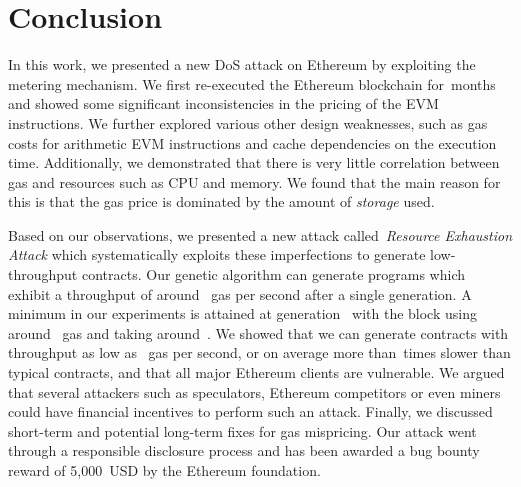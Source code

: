 \section{Conclusion}
\label{sec:conclusion}

In this work, we presented a new DoS attack on Ethereum by exploiting the metering mechanism. We first re-executed the Ethereum blockchain for~\Months months and showed some significant inconsistencies in the pricing of the EVM instructions. We further explored various other design weaknesses, such as gas costs for arithmetic EVM instructions and cache dependencies on the execution time. Additionally, we demonstrated that there is very little correlation between gas and resources such as CPU and memory. We found that the main reason for this is that the gas price is dominated by the amount of \emph{storage} used.

Based on our observations, we presented a new attack called~\emph{Resource Exhaustion Attack} which systematically exploits these imperfections to generate low-throughput contracts. Our genetic algorithm can generate programs which exhibit a throughput of around~ gas per second after a single generation. A minimum in our experiments is attained at generation~ with the block using around~ gas and taking around~.
We showed that we can generate contracts with throughput as low as~ gas per second, or on average more than~\Slowdown times slower than typical contracts, and that all major Ethereum clients are vulnerable. We argued that several attackers such as speculators, Ethereum competitors or even miners could have financial incentives to perform such an attack. Finally, we discussed short-term and potential long-term fixes for gas mispricing. Our attack went through a responsible disclosure process and has been awarded a bug bounty reward of 5,000~USD by the Ethereum foundation.
